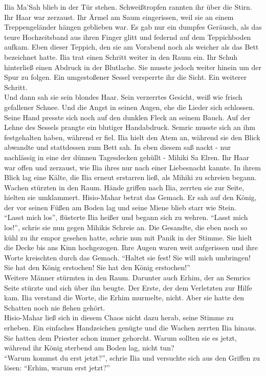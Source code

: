Ilia Ma'Sah blieb in der Tür stehen. Schweißtropfen rannten ihr über die Stirn. Ihr Haar war 
zerzaust. Ihr Ärmel am Saum eingerissen, weil sie an einem Treppengeländer hängen geblieben war. Es 
gab nur ein dumpfes Geräusch, als das teure Hochzeitsband aus ihren Finger glitt und federnd auf 
dem Teppichboden aufkam. Eben dieser Teppich, den sie am Vorabend noch als weicher als das Bett 
bezeichnet hatte. Ilia trat einen Schritt weiter in den Raum ein. Ihr Schuh hinterließ einen 
Abdruck in der Blutlache. Sie musste jedoch weiter hinein um der Spur zu folgen. Ein umgestoßener 
Sessel versperrte ihr die Sicht. Ein weiterer Schritt.\\
Und dann sah sie sein blondes Haar. Sein verzerrtes Gesicht, weiß wie frisch gefallener Schnee. Und 
die Angst in seinen Augen, ehe die Lieder sich schlossen. Seine Hand presste sich noch auf den 
dunklen Fleck an seinem Bauch. Auf der Lehne des Sessels prangte ein blutiger Handabdruck. Semric 
musste sich an ihm festgehalten haben, während er fiel. Ilia hielt den Atem an, während sie den 
Blick abwandte und stattdessen zum Bett sah. In eben diesem saß nackt - nur nachlässig in eine der 
dünnen Tagesdecken gehüllt - Mihiki Sa Elren. Ihr Haar war offen und zerzaust, wie Ilia ihres nur 
nach einer Liebesnacht kannte. In ihrem Blick lag eine Kälte, die Ilia erneut erstarren ließ, als 
Mihiki zu schreien begann.\\
Wachen stürzten in den Raum. Hände griffen nach Ilia, zerrten sie zur Seite, hielten sie 
umklammert. Hisio-Mahar betrat das Gemach. Er sah auf den König, der vor seinen Füßen am Boden lag 
und seine Miene blieb starr wie Stein.\\
``Lasst mich los'', flüsterte Ilia heißer und begann sich zu wehren. ``Lasst mich los!'', schrie 
sie nun gegen Mihikis Schreie an. Die Gesandte, die eben noch so kühl zu ihr empor gesehen 
hatte, schrie nun mit Panik in der Stimme. Sie hielt die Decke bis ans Kinn hochgezogen. Ihre Augen 
waren weit aufgerissen und ihre Worte kreischten durch das Gemach. ``Haltet sie fest! Sie will mich
umbringen! Sie hat den König erstochen! Sie hat den König erstochen!''\\
Weitere Männer stürmten in den Raum. Darunter auch Erhim, der an Semrics Seite stürzte und sich 
über ihn beugte. Der Erste, der dem Verletzten zur Hilfe kam. Ilia verstand die Worte, die Erhim 
murmelte, nicht. Aber sie hatte den Schatten noch nie flehen gehört.\\
Hisio-Mahar ließ sich in diesem Chaos nicht dazu herab, seine Stimme zu erheben. Ein einfaches 
Handzeichen genügte und die Wachen zerrten Ilia hinaus. Sie hatten dem Priester schon immer 
gehorcht. Warum sollten sie es jetzt, während ihr König sterbend am Boden lag, nicht tun?\\
``Warum kommst du erst jetzt?'', schrie Ilia und versuchte sich aus den Griffen zu lösen: 
``Erhim, warum erst jetzt?''\\

